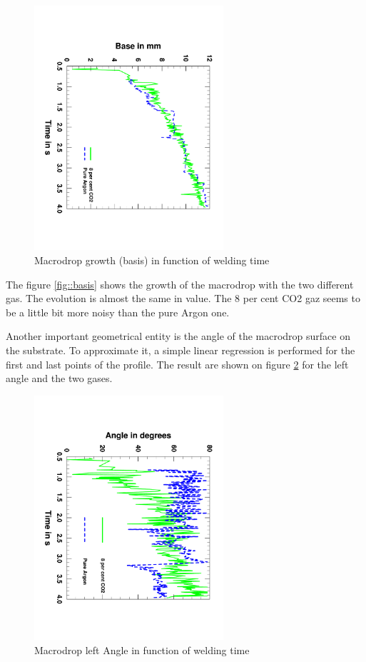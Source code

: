 \documentclass[12pt]{iopart}
\begin{document}
\begin{figure}[h!]
\centering    
\includegraphics[width=7cm,angle=90]{images/Evolution_Base_Gazs.pdf}
\caption{Macrodrop growth (basis) in function of welding time}
\label{fig::macro_drop}
\end{figure}

The figure \ref{fig::basis} shows the growth of the macrodrop with the two different gas.
The evolution is almost the same in value. The 8 per cent CO2 gaz seems to be a little bit 
more noisy than the pure Argon one. 

Another important geometrical entity is the angle of the macrodrop surface on the substrate.
 To approximate it, a simple linear regression is
performed for the first and last points of the profile. The result are shown on figure \ref{fig::angles}
for the left angle and the two gases.
\begin{figure}[h!]
\centering    
\includegraphics[width=7cm,angle=90]{images/Evolution_Angle_Gazs.pdf}
\caption{Macrodrop left Angle in function of welding time}
\label{fig::angles}
\end{figure}
\end{document}
